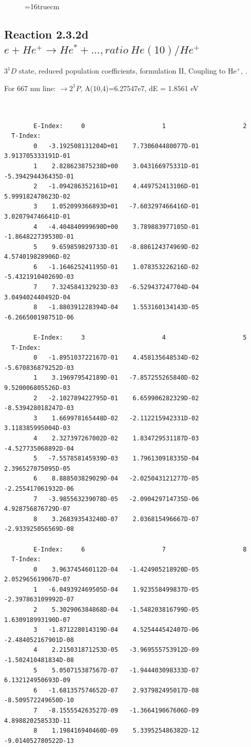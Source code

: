 \documentclass[12pt,dvips]{article}
\begin{document}
\begin{figure} \label{2.3.2c}
\epsfxsize=16truecm
\end{figure}
\newpage


\subsection{
  Reaction 2.3.2d $e + He^+ \rightarrow He^* + ..., ratio ~ He(10)/He^+$
}

  $3^1D$ state,
  reduced population coefficients, formulation II,
  Coupling to He$^+$, \cite{kn:Fujimoto}.

  For 667 nm line: $\rightarrow 2^1P$, A(10,4)=6.27547e7, dE = 1.8561 eV

\begin{small}\begin{verbatim}


        E-Index:     0                     1                     2
  T-Index:
        0   -3.192508131204D+01    7.730604480077D-01    3.913705333191D-01
        1    2.828623875238D+00    3.043166975331D-01   -5.394294436435D-01
        2   -1.094286352161D+01    4.449752413106D-01    5.999182478623D-02
        3    1.052099366893D+01   -7.603297466416D-01    3.020794746641D-01
        4   -4.404840999690D+00    3.789883977105D-01   -1.864822739530D-01
        5    9.659859829733D-01   -8.886124374969D-02    4.574019828906D-02
        6   -1.164625241195D-01    1.078353226216D-02   -5.432191040269D-03
        7    7.324584132923D-03   -6.529437247704D-04    3.049402440492D-04
        8   -1.880391228394D-04    1.553160134143D-05   -6.266500198751D-06

        E-Index:     3                     4                     5
  T-Index:
        0   -1.895103722167D-01    4.458135648534D-02   -5.670836879252D-03
        1    3.196979542189D-01   -7.857255265840D-02    9.520006805526D-03
        2   -2.102789422795D-01    6.659906282329D-02   -8.539428018247D-03
        3    1.669978165448D-02   -2.112215942331D-02    3.118385995004D-03
        4    2.327397267002D-02    1.834729531187D-03   -4.527735068892D-04
        5   -7.557858145939D-03    1.796130918335D-04    2.396527075095D-05
        6    8.888503829029D-04   -2.025043121277D-05   -2.255417061932D-06
        7   -3.985563239078D-05   -2.090429714735D-06    4.928756876729D-07
        8    3.268393543240D-07    2.036815496667D-07   -2.933925056569D-08

        E-Index:     6                     7                     8
  T-Index:
        0    3.963745460112D-04   -1.424905218920D-05    2.052965619067D-07
        1   -6.049392469505D-04    1.923558499837D-05   -2.397863109992D-07
        2    5.302906384868D-04   -1.548203816799D-05    1.630918993190D-07
        3   -1.871228014319D-04    4.525444542407D-06   -2.484052167901D-08
        4    2.215031871253D-05   -3.969555753912D-09   -1.502410481834D-08
        5    5.050715387567D-07   -1.944403098333D-07    6.132124950693D-09
        6   -1.681357574652D-07    2.937982495017D-08   -8.509572249650D-10
        7   -8.155554263527D-09   -1.366419067606D-09    4.898820258533D-11
        8    1.198416940460D-09    5.339525486382D-12   -9.014052780522D-13


\end{verbatim}
\end{small}
\end{document}
